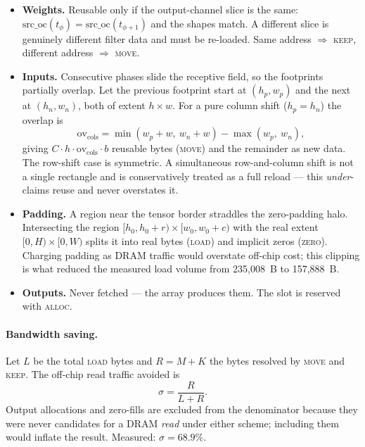 \documentclass[11pt,a4paper]{article}
\newcommand{\op}[1]{\textsc{#1}}
\begin{document}
\begin{itemize}[leftmargin=1.4em,itemsep=3pt]
  \item \textbf{Weights.} Reusable only if the output-channel slice is the
        same: $\text{src\_oc}(t_{\phi}) = \text{src\_oc}(t_{\phi+1})$ and the
        shapes match. A different slice is genuinely different filter data and
        must be re-loaded. Same address $\Rightarrow$ \op{keep}, different
        address $\Rightarrow$ \op{move}.

  \item \textbf{Inputs.} Consecutive phases slide the receptive field, so the
        footprints partially overlap. Let the previous footprint start at
        $(h_p, w_p)$ and the next at $(h_n, w_n)$, both of extent
        $h \times w$. For a pure column shift ($h_p = h_n$) the overlap is
        \[
          \text{ov}_{\text{cols}} =
          \min(w_p{+}w,\ w_n{+}w) - \max(w_p,\ w_n),
        \]
        giving $C \cdot h \cdot \text{ov}_{\text{cols}} \cdot b$ reusable bytes
        (\op{move}) and the remainder as new data. The row-shift case is
        symmetric. A simultaneous row-and-column shift is not a single
        rectangle and is conservatively treated as a full reload --- this
        \emph{under}-claims reuse and never overstates it.

  \item \textbf{Padding.} A region near the tensor border straddles the
        zero-padding halo. Intersecting the region $[h_0, h_0{+}r) \times
        [w_0, w_0{+}c)$ with the real extent $[0,H) \times [0,W)$ splits it
        into real bytes (\op{load}) and implicit zeros (\op{zero}). Charging
        padding as DRAM traffic would overstate off-chip cost; this
        clipping is what reduced the measured load volume from
        235{,}008~B to 157{,}888~B.

  \item \textbf{Outputs.} Never fetched --- the array produces them. The slot
        is reserved with \op{alloc}.
\end{itemize}

\paragraph{Bandwidth saving.} Let $L$ be the total \op{load} bytes and
$R = M + K$ the bytes resolved by \op{move} and \op{keep}. The off-chip read
traffic avoided is
\begin{equation}
  \sigma = \frac{R}{L + R} .
  \label{eq:saving}
\end{equation}
Output allocations and zero-fills are excluded from the denominator because
they were never candidates for a DRAM \emph{read} under either scheme;
including them would inflate the result. Measured: $\sigma = 68.9\%$.
\end{document}
